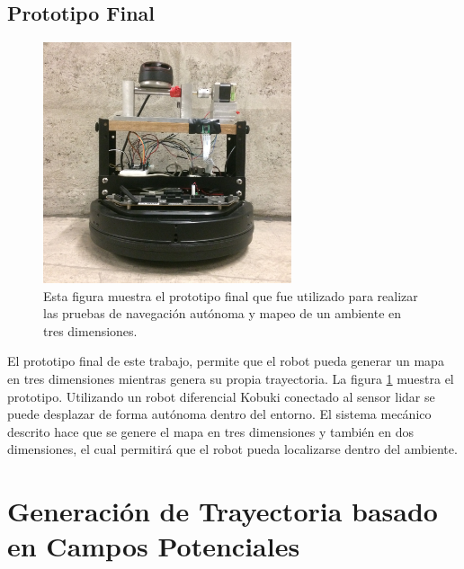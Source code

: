 \subsection{Prototipo Final}
\begin{figure}%
	\centering \footnotesize
	\includegraphics[width=0.65\textwidth]{images/ProtFinal.JPG}
	\captionsetup{font=footnotesize}
	\caption{Esta figura muestra el prototipo final que fue utilizado para realizar las pruebas
	de navegación autónoma y mapeo de un ambiente en tres dimensiones. }
	\label{fig:ProtoFinal}
\end{figure}
El prototipo final de este trabajo, permite que el robot pueda generar un mapa en tres dimensiones 
mientras genera su propia trayectoria. La figura \ref{fig:ProtoFinal} muestra el prototipo. Utilizando
un robot diferencial Kobuki conectado al sensor lidar se puede desplazar de forma autónoma
dentro del entorno. El sistema mecánico descrito hace que se genere el mapa en tres dimensiones
y también en dos dimensiones, el cual permitirá que el robot pueda localizarse dentro del ambiente.



\section{Generaci\'on de Trayectoria basado en Campos Potenciales}
\label{sec:autonomia}

